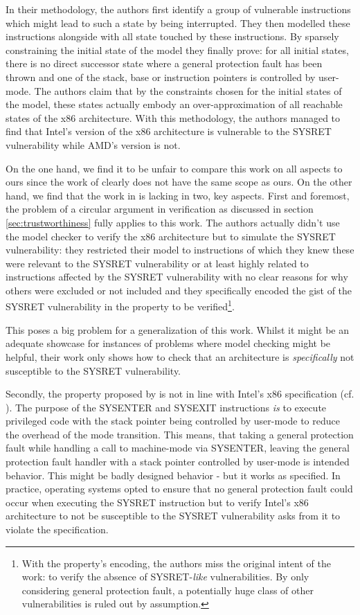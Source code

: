In their methodology, the authors first identify a group of vulnerable instructions which might lead to such a state by being interrupted.
They then modelled these instructions alongside with all state touched by these instructions.
By sparsely constraining the initial state of the model they finally prove: for all initial states, there is no direct successor state where a general protection fault has been thrown and one of the stack, base or instruction pointers is controlled by user-mode.
The authors claim that by the constraints chosen for the initial states of the model, these states actually embody an over-approximation of all reachable states of the x86 architecture.
With this methodology, the authors managed to find that Intel's version of the x86 architecture is vulnerable to the SYSRET vulnerability while AMD's version is not.

On the one hand, we find it to be unfair to compare this work on all aspects to ours since the work of \citeauthor{BradfieldS16} clearly does not have the same scope as ours.
On the other hand, we find that the work in \cite{BradfieldS16} is lacking in two, key aspects.
First and foremost, the problem of a circular argument in verification as discussed in section \ref{sec:trustworthiness} fully applies to this work.
The authors actually didn't use the model checker to verify the x86 architecture but to simulate the SYSRET vulnerability: they restricted their model to instructions of which they knew these were relevant to the SYSRET vulnerability or at least highly related to instructions affected by the SYSRET vulnerability with no clear reasons for why others were excluded or not included and they specifically encoded the gist of the SYSRET vulnerability in the property to be verified\footnote{%
    With the property's encoding, the authors miss the original intent of the work: to verify the absence of SYSRET-\textit{like} vulnerabilities.
    By only considering general protection fault, a potentially huge class of other vulnerabilities is ruled out by assumption.
}.

This poses a big problem for a generalization of this work.
Whilst it might be an adequate showcase for instances of problems where model checking might be helpful, their work only shows how to check that an architecture is \textit{specifically} not susceptible to the SYSRET vulnerability.

Secondly, the property proposed by \citeauthor{BradfieldS16} is not in line with Intel's x86 specification (cf. \cite{Dunlap19}).
The purpose of the SYSENTER and SYSEXIT instructions \textit{is} to execute privileged code with the stack pointer being controlled by user-mode to reduce the overhead of the mode transition.
This means, that taking a general protection fault while handling a call to machine-mode via SYSENTER, leaving the general protection fault handler with a stack pointer controlled by user-mode is intended behavior.
This might be badly designed behavior - but it works as specified.
In practice, operating systems opted to ensure that no general protection fault could occur when executing the SYSRET instruction but to verify Intel's x86 architecture to not be susceptible to the SYSRET vulnerability asks from it to violate the specification.

